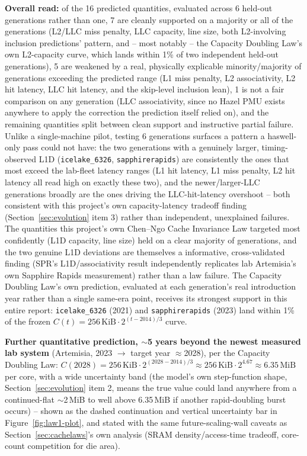 \documentclass{article}
\begin{document}
\textbf{Overall read:} of the 16 predicted quantities, evaluated across 6 held-out
generations rather than one, 7 are cleanly supported on a majority or all of the
generations (L2/LLC miss penalty, LLC capacity, line size, both L2-involving inclusion
predictions' pattern, and -- most notably -- the Capacity Doubling Law's own L2-capacity
curve, which lands within 1\% of two independent held-out generations), 5 are weakened by a
real, physically explicable minority/majority of generations exceeding the predicted range
(L1 miss penalty, L2 associativity, L2 hit latency, LLC hit latency, and the skip-level
inclusion lean), 1 is not a fair comparison on any generation (LLC associativity, since no
Hazel PMU exists anywhere to apply the correction the prediction itself relied on), and the
remaining quantities split between clean support and instructive partial failure. Unlike a
single-machine pilot, testing 6 generations surfaces a pattern a haswell-only pass could
not have: the two generations with a genuinely larger, timing-observed L1D
(\texttt{icelake\_6326}, \texttt{sapphirerapids}) are consistently the ones that most exceed
the lab-fleet latency ranges (L1 hit latency, L1 miss penalty, L2 hit latency all read
high on exactly these two), and the newer/larger-LLC generations broadly are the ones
driving the LLC-hit-latency overshoot -- both consistent with this project's own
capacity-latency tradeoff finding (Section~\ref{sec:evolution} item 3) rather than
independent, unexplained failures. The quantities this project's own Chen--Ngo Cache
Invariance Law targeted most confidently (L1D capacity, line size) held on a clear majority
of generations, and the two genuine L1D deviations are themselves a informative,
cross-validated finding (SPR's L1D/associativity result independently replicates lab
Artemisia's own Sapphire Rapids measurement) rather than a law failure. The Capacity
Doubling Law's own prediction, evaluated at each generation's real introduction year rather
than a single same-era point, receives its strongest support in this entire report:
\texttt{icelake\_6326} (2021) and \texttt{sapphirerapids} (2023) land within 1\% of the
frozen $C(t)=256\,\text{KiB}\cdot2^{(t-2014)/3}$ curve.

\textbf{Further quantitative prediction, $\sim$5 years beyond the newest measured lab
system} (Artemisia, 2023 $\to$ target year $\approx$2028), per the Capacity Doubling Law:
$C(2028) = 256\,\text{KiB}\cdot2^{(2028-2014)/3} \approx 256\,\text{KiB}\cdot 2^{4.67}
\approx 6.35\,\text{MiB}$ per core, with a wide uncertainty band (the model's own step-function
shape, Section~\ref{sec:evolution} item 2, means the true value could land anywhere from a
continued-flat $\sim$2\,MiB to well above 6.35\,MiB if another rapid-doubling burst occurs) --
shown as the dashed continuation and vertical uncertainty bar in Figure~\ref{fig:law1-plot}, and stated
with the same future-scaling-wall caveats as Section~\ref{sec:cachelaws}'s own
analysis (SRAM density/access-time tradeoff, core-count competition for die area).
\end{document}
